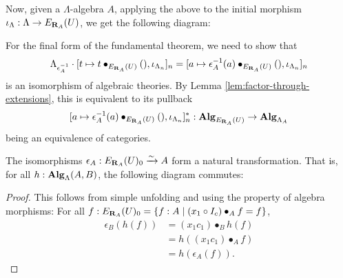 Now, given a $ \Lambda $-algebra $ A $, applying the above to the initial morphism $ \iota_\Lambda : \Lambda \to E_{\mathbf{R}_A}(U) $, we get the following diagram:
\begin{center}
\end{center}
For the final form of the fundamental theorem, we need to show that
\[ \Lambda_{\epsilon_A^{-1}} \cdot [t \mapsto t \bullet_{E_{\mathbf{R}_A}(U)} (), \iota_{\Lambda_n}]_n = [a \mapsto \epsilon_A^{-1}(a) \bullet_{E_{\mathbf{R}_A}(U)} (), \iota_{\Lambda_n}]_n \]
is an isomorphism of algebraic theories. By Lemma \ref{lem:factor-through-extensions}, this is equivalent to its pullback
\[ [a \mapsto \epsilon_A^{-1}(a) \bullet_{E_{\mathbf{R}_A}(U)} (), \iota_{\Lambda_n}]_n^* : \mathbf{Alg}_{E_{\mathbf{R}_A}(U)} \to \mathbf{Alg}_{\Lambda_A} \]
being an equivalence of categories.

\begin{lemma}
  The isomorphisms $ \epsilon_A : E_{\mathbf{R}_A}(U)_0 \xrightarrow \sim A $ form a natural transformation. That is, for all $ h: \mathbf{Alg}_{\Lambda}(A, B) $, the following diagram commutes:
  \begin{center}
  \end{center}
\end{lemma}
\begin{proof}
  This follows from simple unfolding and using the property of algebra morphisms: For all $ f: E_{\mathbf{R}_A}(U)_0 = \{ f : A \mid (x_1 \circ I_c) \bullet_A f = f \} $,
  \begin{align*}
    \epsilon_B(h(f))
    &= (x_1 c_1) \bullet_B h(f)\\
    &= h((x_1 c_1) \bullet_A f)\\
    &= h(\epsilon_A(f)).
  \end{align*}
\end{proof}

